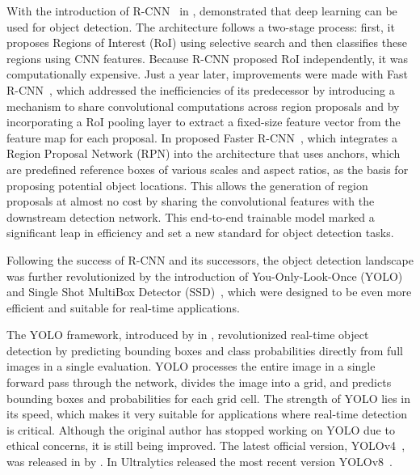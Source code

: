With the introduction of R-CNN~\cite{Girshick14} in \citeyear{Girshick14}, \citeauthor{Girshick14} demonstrated that deep learning can be used for object detection. The architecture follows a two-stage process: first, it proposes Regions of Interest (RoI) using selective search and then classifies these regions using CNN features. Because R-CNN proposed RoI independently, it was computationally expensive. Just a year later, improvements were made with Fast R-CNN~\cite{Girshick15}, which addressed the inefficiencies of its predecessor by introducing a mechanism to share convolutional computations across region proposals and by incorporating a RoI pooling layer to extract a fixed-size feature vector from the feature map for each proposal. In \citeyear{Ren17} \citeauthor{Ren17} proposed Faster R-CNN~\cite{Ren17}, which integrates a Region Proposal Network (RPN) into the architecture that uses anchors, which are predefined reference boxes of various scales and aspect ratios, as the basis for proposing potential object locations. This allows the generation of region proposals at almost no cost by sharing the convolutional features with the downstream detection network. This end-to-end trainable model marked a significant leap in efficiency and set a new standard for object detection tasks.

Following the success of R-CNN and its successors, the object detection landscape was further revolutionized by the introduction of You-Only-Look-Once (YOLO)~\cite{Redmon15} and Single Shot MultiBox Detector (SSD)~\cite{Liu16}, which were designed to be even more efficient and suitable for real-time applications.

The YOLO framework, introduced by \citeauthor{Redmon15} in \citeyear{Redmon15}, revolutionized real-time object detection by predicting bounding boxes and class probabilities directly from full images in a single evaluation. YOLO processes the entire image in a single forward pass through the network, divides the image into a grid, and predicts bounding boxes and probabilities for each grid cell. The strength of YOLO lies in its speed, which makes it very suitable for applications where real-time detection is critical. Although the original author has stopped working on YOLO due to ethical concerns, it is still being improved. The latest official version, YOLOv4~\cite{Bochkovskiy20}, was released in \citeyear{Bochkovskiy20} by \citeauthor{Bochkovskiy20}. In \citeyear{Jocher23a} Ultralytics released the most recent version YOLOv8~\cite{Jocher23a, Jocher23b}.

